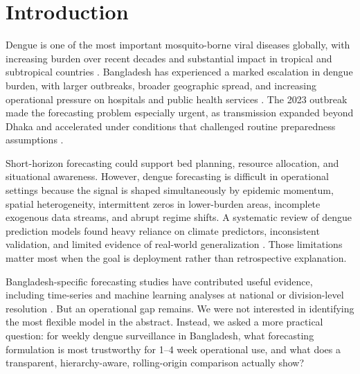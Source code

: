 \documentclass[11pt]{article}
\begin{document}
\begin{abstract}
\textbf{Interpretation:} The most defensible result is not that one challenger model has already replaced persistence, but that challenger gains are window-dependent and do not yet survive recent-window stress testing. In this data environment, operational dengue forecasting in Bangladesh is governed primarily by short-run case momentum, hierarchy consistency, and robustness under regime shift. Until new post-tuning data are available for a truly untouched final evaluation block, persistence remains the appropriate primary operational forecast.
\end{abstract}

\section{Introduction}
Dengue is one of the most important mosquito-borne viral diseases globally, with increasing burden over recent decades and substantial impact in tropical and subtropical countries \citep{bhatt2013global,zheng2025global}. Bangladesh has experienced a marked escalation in dengue burden, with larger outbreaks, broader geographic spread, and increasing operational pressure on hospitals and public health services \citep{hossain2023twentytwo}. The 2023 outbreak made the forecasting problem especially urgent, as transmission expanded beyond Dhaka and accelerated under conditions that challenged routine preparedness assumptions \citep{who2023bangladesh}.

Short-horizon forecasting could support bed planning, resource allocation, and situational awareness. However, dengue forecasting is difficult in operational settings because the signal is shaped simultaneously by epidemic momentum, spatial heterogeneity, intermittent zeros in lower-burden areas, incomplete exogenous data streams, and abrupt regime shifts. A systematic review of dengue prediction models found heavy reliance on climate predictors, inconsistent validation, and limited evidence of real-world generalization \citep{leung2023systematic}. Those limitations matter most when the goal is deployment rather than retrospective explanation.

Bangladesh-specific forecasting studies have contributed useful evidence, including time-series and machine learning analyses at national or division-level resolution \citep{naher2022forecasting,liu2025comparative}. But an operational gap remains. We were not interested in identifying the most flexible model in the abstract. Instead, we asked a more practical question: for weekly dengue surveillance in Bangladesh, what forecasting formulation is most trustworthy for 1--4 week operational use, and what does a transparent, hierarchy-aware, rolling-origin comparison actually show?
\end{document}
